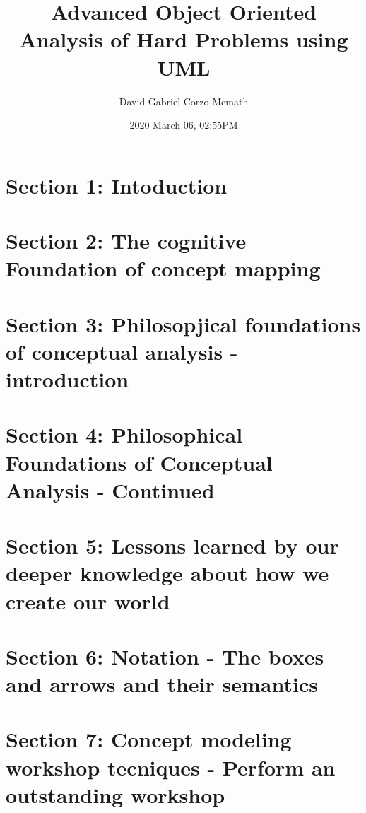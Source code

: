 \documentclass[openany]{book}
\title{Advanced Object Oriented Analysis of Hard Problems using UML}
\date{2020 March 06, 02:55PM}
\author{David Gabriel Corzo Mcmath}
\begin{document}
\maketitle
\tableofcontents


\chapter{Section 1: Intoduction}



\chapter{Section 2: The cognitive Foundation of concept mapping }


\chapter{Section 3: Philosopjical foundations of conceptual analysis - introduction}


\chapter{Section 4: Philosophical Foundations of Conceptual Analysis - Continued}


\chapter{Section 5: Lessons learned by our deeper knowledge about how we create our world}


\chapter{Section 6: Notation - The boxes and arrows and their semantics}


\chapter{Section 7: Concept modeling workshop tecniques - Perform an outstanding workshop}








\end{document}
